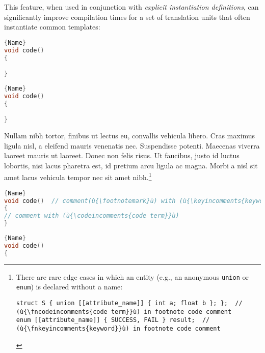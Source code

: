 {This feature, when used in conjunction with \emph{explicit instantiation
definitions}, can significantly improve compilation times for a set of
translation units that often instantiate common templates:

\noindent\begin{minipage}{.45\textwidth}
\begin{lstlisting}[language=C++, caption=code 1,frame=tb]{Name}
void code()
{

}
\end{lstlisting}
\end{minipage}\hfill
\begin{minipage}{.45\textwidth}
\begin{lstlisting}[language=C++, caption=code 2,frame=tb]{Name}
void code()
{

}
\end{lstlisting}
\end{minipage}

Nullam nibh tortor, finibus ut lectus eu, convallis vehicula libero. Cras maximus ligula nisl, a eleifend mauris venenatis nec. Suspendisse potenti. Maecenas viverra laoreet mauris ut laoreet. Donec non felis risus. Ut faucibus, justo id luctus lobortis, nisi lacus pharetra est, id pretium arcu ligula ac magna. Morbi a nisl sit amet lacus vehicula tempor nec sit amet nibh.{\cprotect\footnote{There are rare edge cases in which an
entity (e.g., an anonymous \lstinline!union! or \lstinline!enum!) is
declared without a name:
\begin{lstlisting}[style=footcode,]
struct S { union [[attribute_name]] { int a; float b }; };  // (ù{\fncodeincomments{code term}}ù) in footnote code comment
enum [[attribute_name]] { SUCCESS, FAIL } result;  //  (ù{\fnkeyincomments{keyword}}ù) in footnote code comment
\end{lstlisting} \vspace*{-1ex}
      }}


\noindent\begin{minipage}{.45\textwidth}
\begin{lstlisting}[language=C++, caption=code 1 with a long and wrapping title,frame=tb]{Name}
void code()  // comment(ù{\footnotemark}ù) with (ù{\keyincomments{keyword}}ù)
{
// comment with (ù{\codeincomments{code term}}ù)
}
\end{lstlisting}
\end{minipage}\hfill
\begin{minipage}{.45\textwidth}
\begin{lstlisting}[language=C++, caption=code 2 with a long and wrapping title,frame=tb]{Name}
void code()
{


\end{lstlisting}
\end{minipage}}
